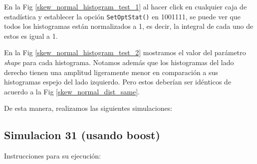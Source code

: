 \documentclass[11pt,letterpaper]{article}
\begin{document}
En la Fig \ref{skew_normal_histogram_test_1} al hacer click en cualquier caja de estadística y establecer la opción \verb|SetOptStat()| en 1001111, se puede ver que todos los histogramas están normalizados a 1, es decir, la integral de cada uno de estos es igual a 1.

En la Fig \ref{skew_normal_histogram_test_2} mostramos el valor del parámetro \textit{shape} para cada histograma. Notamos además que los histogramas del lado derecho tienen una amplitud ligeramente menor en comparación a sus  histogramas espejo del lado izquierdo. Pero estos deberían ser idénticos de acuerdo a la Fig \ref{skew_normal_dist_same}.

De esta manera, realizamos las siguientes simulaciones:

\subsection*{Simulacion 31 (usando boost)}

Instrucciones para su ejecución:
\end{document}
